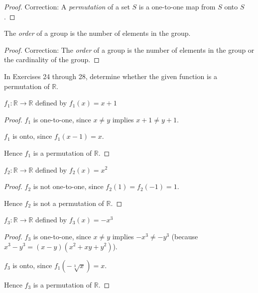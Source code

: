 \begin{proof}
    Correction:  A \textit{permutation} of a set $S$ is a one-to-one map from $S$ onto $S$.
\end{proof}

\begin{exercise}
    The \textit{order} of a group is the number of elements in the group.
\end{exercise}

\begin{proof}
    Correction: The \textit{order} of a group is the number of elements in the group or the cardinality of the group.
\end{proof}

In Exercises 24 through 28, determine whether the given function is a permutation of $\mathbb{R}$.

\begin{exercise}
    $f_{1}: \mathbb{R} \to \mathbb{R}$ defined by $f_{1}(x) = x + 1$
\end{exercise}

\begin{proof}
    $f_{1}$ is one-to-one, since $x\ne y$ implies $x+1\ne y+1$.

    $f_{1}$ is onto, since $f_{1}(x - 1) = x$.

    Hence $f_{1}$ is a permutation of $\mathbb{R}$.
\end{proof}

\begin{exercise}
    $f_{2}: \mathbb{R} \to \mathbb{R}$ defined by $f_{2}(x) = x^{2}$
\end{exercise}

\begin{proof}
    $f_{2}$ is not one-to-one, since $f_{2}(1) = f_{2}(-1) = 1$.

    Hence $f_{2}$ is not a permutation of $\mathbb{R}$.
\end{proof}

\begin{exercise}
    $f_{3}: \mathbb{R} \to \mathbb{R}$ defined by $f_{3}(x) = -x^{3}$
\end{exercise}

\begin{proof}
    $f_{3}$ is one-to-one, since $x\ne y$ implies $-x^{3} \ne -y^{3}$ (because $x^{3} - y^{3} = (x - y)(x^{2} + xy + y^{2})$).

    $f_{3}$ is onto, since $f_{1}(-\sqrt[3]{x}) = x$.

    Hence $f_{3}$ is a permutation of $\mathbb{R}$.
\end{proof}

